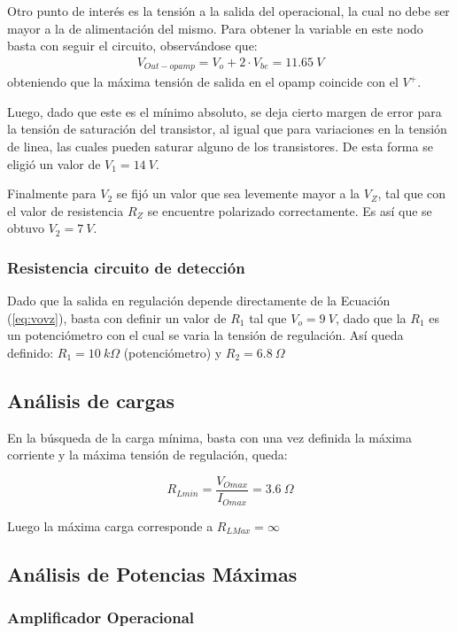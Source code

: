 Otro punto de interés es la tensión a la salida del operacional, la cual no debe ser mayor a la de alimentación del mismo. Para obtener la variable en este nodo basta con seguir el circuito, observándose que:
\begin{align}
V_{Out-opamp}= V_o+2\cdot V_{be} = 11.65 \ V
\end{align}
obteniendo que la máxima tensión de salida en el opamp coincide con el $V^+$.

Luego, dado que este es el mínimo absoluto, se deja cierto margen de error para la tensión de saturación del transistor, al igual que para variaciones en la tensión de linea, las cuales pueden saturar alguno de los transistores. De esta forma se eligió un valor de $V_1=14 \ V$.

Finalmente para $V_2$ se fijó un valor que sea levemente mayor a la $V_Z$, tal que con el valor de resistencia $R_Z$ se encuentre polarizado correctamente. Es así que se obtuvo $V_2=7 \ V$.

\subsubsection{Resistencia circuito de detección}
\label{sec:resdet}
Dado que la salida en regulación depende directamente de la Ecuación (\ref{eq:vovz}), basta con definir un valor de $R_1$ tal que $V_o=9 \ V$, dado que la $R_1$ es un potenciómetro con el cual se varia la tensión de regulación. Así queda definido: $R_1= 10 \ k\Omega$ (potenciómetro) y $R_2=6.8  \  \Omega$

\subsection{Análisis de cargas}
En la búsqueda de la carga mínima, basta con una vez definida la máxima corriente y la máxima tensión de regulación, queda:

\begin{equation}
	R_{Lmin} = \frac{V_{Omax}}{I_{Omax}} = 3.6 \ \Omega
\end{equation}

Luego la máxima carga corresponde a $R_{LMax} = \infty$

\subsection{Análisis de Potencias Máximas}

\subsubsection{Amplificador Operacional}
\label{sec:opamppot}

